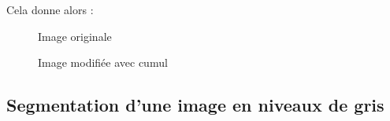 \documentclass[french,a4paper,10pt]{article}
\begin{document}
	Cela donne alors :
	\begin{figure}[!htb]
		\begin{minipage}{0.48\textwidth}
			\centering
			\caption{Image originale}\label{Fig:orig-08-7}
		\end{minipage}\hfill
		\begin{minipage}{0.48\textwidth}
			\centering
			\caption{Image modifiée avec cumul}\label{Fig:fermeture-ouverture-grey-08-2}
		\end{minipage}
	\end{figure}


	\newpage
	\subsection{Segmentation d'une image en niveaux de gris}\label{subsec:5.7}
\end{document}
